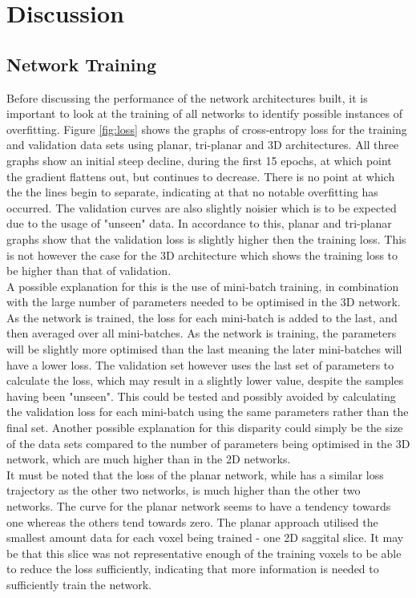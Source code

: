 \documentclass[11pt,a4paper]{memoir}
\numberwithin{figure}{section}
\numberwithin{table}{section}
\numberwithin{equation}{section}
\begin{document}
\chapter{Discussion}
\section{Network Training}
Before discussing the performance of the network architectures built, it is important to look at the training of all networks to identify possible instances of overfitting. Figure \ref{fig:loss} shows the graphs of cross-entropy loss for the training and validation data sets using planar, tri-planar and 3D architectures. All three graphs show an initial steep decline, during the first 15 epochs, at which point the gradient flattens out, but continues to decrease. There is no point at which the the lines begin to separate, indicating at that no notable overfitting has occurred. The validation curves are also slightly noisier which is to be expected due to the usage of "unseen" data. In accordance to this, planar and tri-planar graphs show that the validation loss is slightly higher then the training loss. This is not however the case for the 3D architecture which shows the training loss to be higher than that of validation.\\ 

A possible explanation for this is the use of mini-batch training, in combination with the large number of parameters needed to be optimised in the 3D network. As the network is trained, the loss for each mini-batch is added to the last, and then averaged over all mini-batches. As the network is training, the parameters will be slightly more optimised than the last meaning the later mini-batches will have a lower loss. The validation set however uses the last set of parameters to calculate the loss, which may result in a slightly lower value, despite the samples having been "unseen". This could be tested and possibly avoided by calculating the validation loss for each mini-batch using the same parameters rather than the final set. Another possible explanation for this disparity could simply be the size of the data sets compared to the number of parameters being optimised in the 3D network, which are much higher than in the 2D networks.   \\

It must be noted that the loss of the planar network, while has a similar loss trajectory as the other two networks, is much higher than the other two networks. The curve for the planar network seems to have a tendency towards one whereas the others tend towards zero. The planar approach utilised the smallest amount data for each voxel being trained - one 2D saggital slice. It may be that this slice was not representative enough of the training voxels to be able to reduce the loss sufficiently, indicating that more information  is needed to sufficiently train the network. \\
\end{document}
